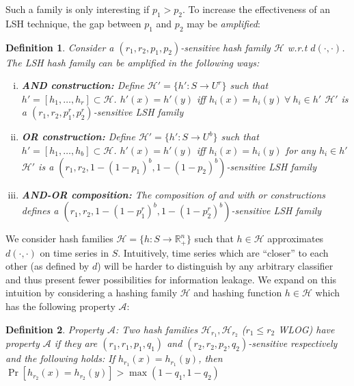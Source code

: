\documentclass[a4paper]{article}
\newtheorem{definition}{Definition}
\begin{document}
Such a family is only interesting if $p_1 > p_2$.
To increase the effectiveness of an LSH technique, the gap between $p_1$ and $p_2$ may be \textit{amplified}:

\begin{definition}\label{defn:lsh_amplification}
    Consider a $(r_1, r_2, p_1, p_2)$-sensitive hash family $\mathcal{H}$ w.r.t $d(\cdot,\cdot)$. The LSH hash family can be amplified in the following ways:
    \begin{enumerate}[(i)]
        \item \textbf{AND construction:} Define $\mathcal{H}' = \{h' : S \rightarrow U^r\}$ such that $h' = [h_1, \ldots, h_r] \subset \mathcal{H}$.
            $h'(x) = h'(y)$ iff $h_i(x) = h_i(y) ~\forall~h_i \in h'$
            $\mathcal{H'}$ is a $(r_1, r_2, p_1^r, p_2^r)$-sensitive LSH family
        \item \textbf{OR construction:} Define $\mathcal{H}' = \{h' : S \rightarrow U^b\}$ such that $h' = [h_1, \ldots, h_b] \subset \mathcal{H}$.
            $h'(x) = h'(y)$ iff $h_i(x) = h_i(y)$ for any $h_i \in h'$
            $\mathcal{H'}$ is a $(r_1, r_2, 1-{(1-p_1)}^b, 1-{(1-p_2)}^b)$-sensitive LSH family
        \item \textbf{AND-OR composition:} The composition of \textnormal{and} with \textnormal{or} constructions defines a $(r_1, r_2, 1-{(1-p_1^r)}^b, 1-{(1-p_2^r)}^b)$-sensitive LSH family
    \end{enumerate}
\end{definition}

We consider hash families $\mathcal{H} = \{h : S \rightarrow \mathbb{R}_{+}^n\}$ such that $h \in \mathcal{H}$ approximates $d(\cdot,\cdot)$ on time series in $S$.
Intuitively, time series which are ``closer'' to each other (as defined by $d$) will be harder to distinguish by any arbitrary classifier and thus present fewer possibilities for information leakage.
We expand on this intuition by considering a hashing family $\mathcal{H}$ and hashing function $h \in \mathcal{H}$ which has the following property $\mathscr{A}$:


\begin{definition}\label{defn:property_alpha}
    Property $\mathscr{A}$:
    Two hash families $\mathcal{H}_{r_1}, \mathcal{H}_{r_2}$ ($r_1 \le r_2$ \textnormal{WLOG}) have property $\mathscr{A}$ if they are $(r_1, r_1, p_1, q_1)$ and $(r_2, r_2, p_2, q_2)$-sensitive respectively and the following holds:
    If $h_{r_1}(x) = h_{r_1}(y)$, then $\Pr[h_{r_2}(x) = h_{r_2}(y)] > \max(1 - q_1, 1 - q_2)$
\end{definition}
\end{document}
